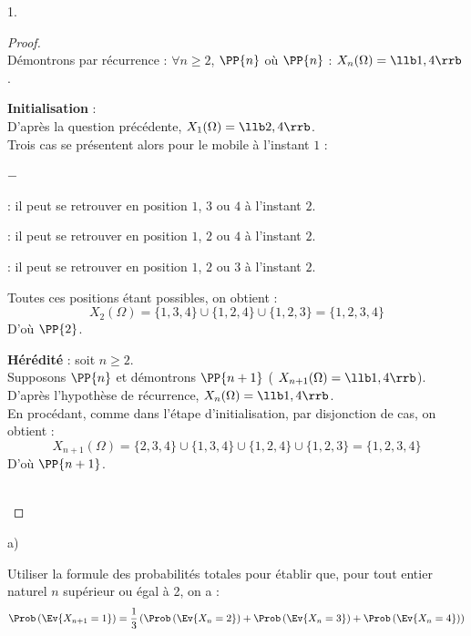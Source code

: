 \documentclass[11pt]{article}%
\begin{document}
\begin{noliste}{1.}
  \begin{proof}~\\%
    Démontrons par récurrence : $\forall n \geq 2$, $\PP{n}$ \quad
    où \quad $\PP{n}$ : $X_n(\Omega) = \llb 1, 4\rrb$.
    \begin{noliste}{\fitem}
    \item {\bf Initialisation} :\\
      D'après la question précédente, $X_1(\Omega) = \llb 2,
      4\rrb$.\\
      Trois cas se présentent alors pour le mobile à l'instant $1$ :
      \begin{noliste}{$-$}
      \item {} : il peut se
        retrouver en position $1$, $3$ ou $4$ à l'instant $2$.
      \item {} : il peut se
        retrouver en position $1$, $2$ ou $4$ à l'instant $2$.
      \item {} : il peut se
        retrouver en position $1$, $2$ ou $3$ à l'instant $2$.        
      \end{noliste}
      Toutes ces positions étant possibles, on obtient :
      \[
      X_2(\Omega) = \{1, 3, 4\} \cup \{1, 2, 4\} \cup \{1, 2, 3\} =
      \{1, 2, 3, 4\}
      \]
      D'où $\PP{2}$.
    \item {\bf Hérédité} : soit $n \geq 2$.\\
      Supposons $\PP{n}$ et démontrons $\PP{n+1}$ (\ie
      $X_{n+1}(\Omega) = \llb 1, 4\rrb$).\\[.2cm]
      D'après l'hypothèse de récurrence, $X_n(\Omega) = \llb 1, 4
      \rrb$. \\
      En procédant, comme dans l'étape d'initialisation, par
      disjonction de cas, on obtient :
      \[
      X_{n+1}(\Omega) = \{2, 3, 4\} \cup \{1, 3, 4\} \cup \{1, 2, 4\}
      \cup \{1, 2, 3\} = \{1, 2, 3, 4\}
      \]
      D'où $\PP{n+1}$.
    \end{noliste}
    ~\\[-1.4cm]
  \end{proof}

\item
  \begin{noliste}{a)}
    \setlength{\itemsep}{2mm}
  \item Utiliser la formule des probabilités totales pour établir que,
    pour tout entier naturel $n$ supérieur ou égal à 2, on a :
    \[
    \Prob\left(\Ev{X_{n + 1} = 1}\right) =
    \dfrac{1}{3}\left(\Prob\left(\Ev{X_{n} = 2}\right) + \Prob\left(\Ev{X_{n}
          = 3}\right) + \Prob\left(\Ev{X_{n} = 4}\right)\right)
    \]


\end{noliste}
\end{noliste}
\end{document}
